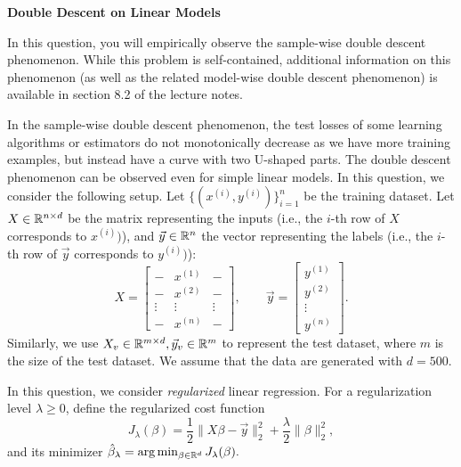 \item {} {\bf Double Descent on Linear Models}

In this question, you will empirically observe the sample-wise double descent phenomenon. While this problem is self-contained, additional information on this phenomenon (as well as the related model-wise double descent phenomenon) is available in section 8.2 of the lecture notes. 

In the sample-wise double descent phenomenon, the test losses of some learning algorithms or estimators do not monotonically decrease as we have more training examples, but instead have a curve with two U-shaped parts. The double descent phenomenon can be observed even for simple linear models. In this question, we consider the following setup. Let $\{(x^{(i)},y^{(i)})\}_{i=1}^{n}$ be the training dataset. Let $X\in\mathbb{R}^{n\times d}$ be the matrix representing the inputs (i.e., the $i$-th row of $X$ corresponds to $x^{(i)})$), and $\vec{y}\in\mathbb{R}^{n}$ the vector representing the labels (i.e., the $i$-th row of $\vec{y}$ corresponds to $y^{(i)})$):
$$
X=
\begin{bmatrix}
	- & x^{(1)} & - \\
	- & x^{(2)} & - \\
	\vdots & \vdots & \vdots\\
	- & x^{(n)} & - 
\end{bmatrix},\qquad
\vec{y}=
\begin{bmatrix}
	y^{(1)} \\
	y^{(2)}\\
	\vdots\\
	y^{(n)}
\end{bmatrix}.
$$
Similarly, we use $X_v\in \mathbb{R}^{m\times d}, \vec{y}_v\in \mathbb{R}^{m}$ to represent the test dataset, where $m$ is the size of the test dataset. We assume that the data are generated with $d=500$. 

In this question, we consider \emph{regularized} linear regression. For a regularization level $\lambda\ge 0$, define the regularized cost function $$J_\lambda(\beta)=\frac{1}{2}\|X\beta-\vec{y}\|_2^2+\frac{\lambda}{2}\|\beta\|_2^2,$$ and its minimizer $\hat{\beta}_\lambda=\arg\min_{\beta\in \mathbb{R}^{d}}J_\lambda(\beta).$

\begin{enumerate}
 	
	\ifnum{} {
	
} \fi


\ifnum{} {
	
} \fi

	
	\ifnum{} {
	
	} \fi

\end{enumerate}
